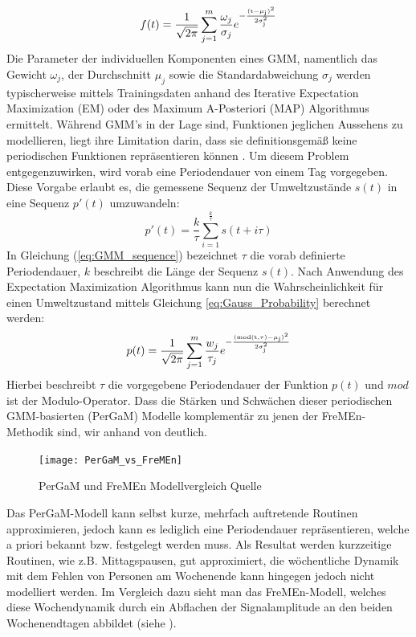 \begin{equation}
	f(t) = \frac{1}{\sqrt{2 \pi}} \sum_{j=1}^{m} \frac{\omega_j}{\sigma_j} e^{\mathrm{- \frac{(t- \mu_j)^2}{2 \sigma_j ^2}}}
	\label{eq:Gaussian_Mixture_Models}
\end{equation}
Die Parameter der individuellen Komponenten eines GMM, namentlich das Gewicht $\omega_j$, der Durchschnitt $\mu_j$ sowie die Standardabweichung $\sigma_j$ werden typischerweise mittels Trainingsdaten anhand des Iterative Expectation Maximization (EM) oder des Maximum A-Posteriori (MAP) Algorithmus ermittelt. Während GMM's in der Lage sind, Funktionen jeglichen Aussehens zu modellieren, liegt ihre Limitation darin, dass sie definitionsgemäß keine periodischen Funktionen repräsentieren können \cite{Krajnik.2015b}. Um diesem Problem entgegenzuwirken, wird vorab eine Periodendauer von einem Tag vorgegeben. Diese Vorgabe erlaubt es, die gemessene Sequenz der Umweltzustände $s(t)$  in eine Sequenz $p'(t)$ umzuwandeln:
\begin{equation}
	p'(t) = \frac{k}{\tau} \sum_{i=1}^{\frac{k}{\tau}} s(t+i \tau)
	\label{eq:GMM_sequence}
\end{equation}
In Gleichung (\ref{eq:GMM_sequence}) bezeichnet $\tau$ die vorab definierte Periodendauer, $k$ beschreibt die Länge der Sequenz $s(t)$. Nach Anwendung des Expectation Maximization Algorithmus kann nun die Wahrscheinlichkeit für einen Umweltzustand mittels Gleichung \ref{eq:Gauss_Probability} berechnet werden: 
\begin{equation}
	p(t) = \frac{1}{\sqrt{2 \pi}} \sum_{j=1}^{m} \frac{w_j}{\tau_j} e ^{\mathrm{- \frac{(mod(t,\tau) - \mu_j)^2}{2 \sigma_j^2}}}
	\label{eq:Gauss_Probability}
\end{equation}
Hierbei beschreibt $\tau$ die vorgegebene Periodendauer der Funktion $p(t)$ und $mod$ ist der Modulo-Operator. Dass die Stärken und Schwächen dieser periodischen GMM-basierten (PerGaM) Modelle komplementär zu jenen der FreMEn-Methodik sind, wir anhand von  deutlich.
\begin{figure}[!ht]
	\begin{center}
		\texttt{[image: PerGaM\_vs\_FreMEn]}
		\caption{PerGaM und FreMEn Modellvergleich Quelle \cite{Krajnik.2015b}}
		\label{fig.PerGaM_vs_FreMEn}
	\end{center}
\end{figure}
Das PerGaM-Modell kann selbst kurze, mehrfach auftretende Routinen approximieren, jedoch kann es lediglich eine Periodendauer repräsentieren, welche a priori bekannt bzw. festgelegt werden muss. Als Resultat werden kurzzeitige Routinen, wie z.B. Mittagspausen, gut approximiert, die wöchentliche Dynamik mit dem Fehlen von Personen am Wochenende kann hingegen jedoch nicht modelliert werden. Im Vergleich dazu sieht man das FreMEn-Modell, welches diese Wochendynamik durch ein Abflachen der Signalamplitude an den beiden Wochenendtagen abbildet (siehe ). \\
